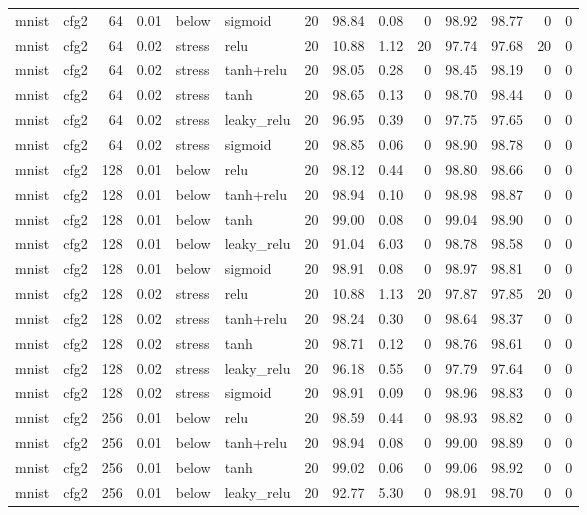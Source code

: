 \begin{table}[htbp]
{\begin{tabular}{@{}llrrllrrrrrrrr@{}}
mnist & cfg2 & 64 & 0.01 & below & sigmoid & 20 & 98.84 & 0.08 & 0 & 98.92 & 98.77 & 0 & 0 \\
mnist & cfg2 & 64 & 0.02 & stress & relu & 20 & 10.88 & 1.12 & 20 & 97.74 & 97.68 & 20 & 0 \\
mnist & cfg2 & 64 & 0.02 & stress & tanh+relu & 20 & 98.05 & 0.28 & 0 & 98.45 & 98.19 & 0 & 0 \\
mnist & cfg2 & 64 & 0.02 & stress & tanh & 20 & 98.65 & 0.13 & 0 & 98.70 & 98.44 & 0 & 0 \\
mnist & cfg2 & 64 & 0.02 & stress & leaky\_relu & 20 & 96.95 & 0.39 & 0 & 97.75 & 97.65 & 0 & 0 \\
mnist & cfg2 & 64 & 0.02 & stress & sigmoid & 20 & 98.85 & 0.06 & 0 & 98.90 & 98.78 & 0 & 0 \\
mnist & cfg2 & 128 & 0.01 & below & relu & 20 & 98.12 & 0.44 & 0 & 98.80 & 98.66 & 0 & 0 \\
mnist & cfg2 & 128 & 0.01 & below & tanh+relu & 20 & 98.94 & 0.10 & 0 & 98.98 & 98.87 & 0 & 0 \\
mnist & cfg2 & 128 & 0.01 & below & tanh & 20 & 99.00 & 0.08 & 0 & 99.04 & 98.90 & 0 & 0 \\
mnist & cfg2 & 128 & 0.01 & below & leaky\_relu & 20 & 91.04 & 6.03 & 0 & 98.78 & 98.58 & 0 & 0 \\
mnist & cfg2 & 128 & 0.01 & below & sigmoid & 20 & 98.91 & 0.08 & 0 & 98.97 & 98.81 & 0 & 0 \\
mnist & cfg2 & 128 & 0.02 & stress & relu & 20 & 10.88 & 1.13 & 20 & 97.87 & 97.85 & 20 & 0 \\
mnist & cfg2 & 128 & 0.02 & stress & tanh+relu & 20 & 98.24 & 0.30 & 0 & 98.64 & 98.37 & 0 & 0 \\
mnist & cfg2 & 128 & 0.02 & stress & tanh & 20 & 98.71 & 0.12 & 0 & 98.76 & 98.61 & 0 & 0 \\
mnist & cfg2 & 128 & 0.02 & stress & leaky\_relu & 20 & 96.18 & 0.55 & 0 & 97.79 & 97.64 & 0 & 0 \\
mnist & cfg2 & 128 & 0.02 & stress & sigmoid & 20 & 98.91 & 0.09 & 0 & 98.96 & 98.83 & 0 & 0 \\
mnist & cfg2 & 256 & 0.01 & below & relu & 20 & 98.59 & 0.44 & 0 & 98.93 & 98.82 & 0 & 0 \\
mnist & cfg2 & 256 & 0.01 & below & tanh+relu & 20 & 98.94 & 0.08 & 0 & 99.00 & 98.89 & 0 & 0 \\
mnist & cfg2 & 256 & 0.01 & below & tanh & 20 & 99.02 & 0.06 & 0 & 99.06 & 98.92 & 0 & 0 \\
mnist & cfg2 & 256 & 0.01 & below & leaky\_relu & 20 & 92.77 & 5.30 & 0 & 98.91 & 98.70 & 0 & 0 \\

\end{tabular}}
\end{table}
